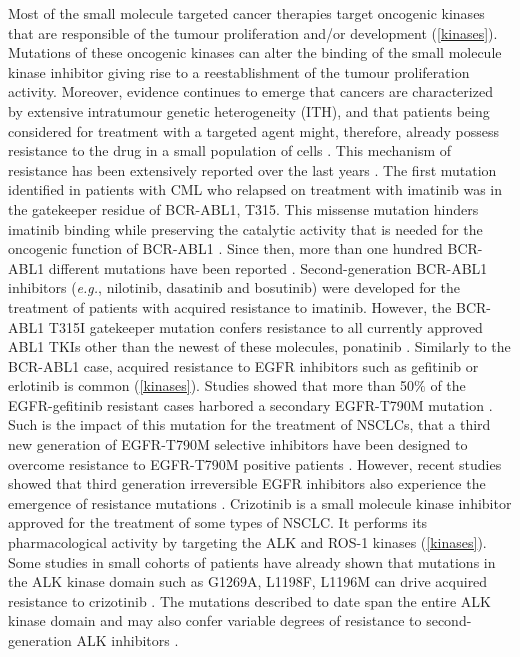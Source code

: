 \documentclass[11pt, b5paper,twoside]{tesi_upf}
\begin{document}
\par Most of the small molecule targeted cancer therapies target oncogenic kinases that are responsible of the tumour proliferation and/or development (\cref{kinases}). Mutations of these oncogenic kinases can alter the binding of the small molecule kinase inhibitor giving rise to a reestablishment of the tumour proliferation activity. Moreover, evidence continues to emerge that cancers are characterized by extensive intratumour genetic heterogeneity (ITH), and that patients being considered for treatment with a targeted agent might, therefore, already possess resistance to the drug in a small population of cells \cite{Schmitt2015}. This mechanism of resistance has been extensively reported over the last years \cite{Chen2011, Barouch-Bentov2011a}. The first mutation identified in patients with CML who relapsed on treatment with imatinib was in the gatekeeper residue of BCR-ABL1, T315. This missense  mutation hinders imatinib binding while preserving the catalytic activity that is needed for the oncogenic function of BCR-ABL1 \cite{Gorre2001}. Since then, more than one hundred BCR-ABL1 different mutations have been reported \cite{Soverini2016}. Second-generation BCR-ABL1 inhibitors (\textit{e.g.}, nilotinib, dasatinib and bosutinib) were developed for the treatment of patients with acquired resistance to imatinib. However, the BCR-ABL1 T315I gatekeeper mutation confers resistance to all currently approved ABL1 TKIs other than the newest of these molecules, ponatinib \cite{Soverini2016}. Similarly to the BCR-ABL1 case, acquired resistance to EGFR inhibitors such as gefitinib or erlotinib is common (\cref{kinases}). Studies showed that more than 50$\%$ of the EGFR-gefitinib resistant cases harbored a secondary EGFR-T790M mutation \cite{Shih2005}. Such is the impact of this mutation for the treatment of NSCLCs, that a third new generation of EGFR-T790M selective inhibitors have been designed to overcome resistance to EGFR-T790M positive patients \cite{Walter2013, Cross2014}. However, recent studies showed that third generation irreversible EGFR inhibitors also experience the emergence of resistance mutations \cite{Ercan2015}. Crizotinib is a small molecule kinase inhibitor approved for the treatment of some types of NSCLC. It performs its pharmacological activity by targeting the ALK and ROS-1 kinases (\cref{kinases}). Some studies in small cohorts of patients have already shown that mutations in the ALK kinase domain such as G1269A, L1198F, L1196M can drive acquired resistance to crizotinib \cite{Doebele2012, Shaw2015}. The mutations described to date span the entire ALK kinase domain and may also confer variable degrees of resistance to second-generation ALK inhibitors \cite{Wu2016}. 
\end{document}
